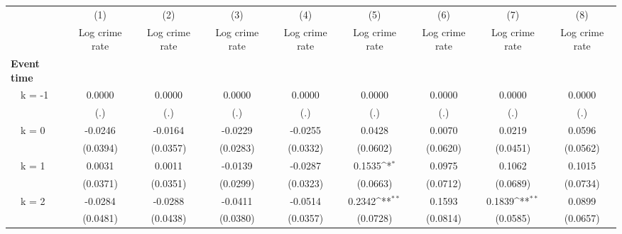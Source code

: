 {
\def\sym#1{\ifmmode^{#1}\else\(^{#1}\)\fi}
\begin{tabular}{l*{8}{c}}
\toprule
                &\multicolumn{1}{c}{(1)}&\multicolumn{1}{c}{(2)}&\multicolumn{1}{c}{(3)}&\multicolumn{1}{c}{(4)}&\multicolumn{1}{c}{(5)}&\multicolumn{1}{c}{(6)}&\multicolumn{1}{c}{(7)}&\multicolumn{1}{c}{(8)}\\
                &\multicolumn{1}{c}{Log crime rate}&\multicolumn{1}{c}{Log crime rate}&\multicolumn{1}{c}{Log crime rate}&\multicolumn{1}{c}{Log crime rate}&\multicolumn{1}{c}{Log crime rate}&\multicolumn{1}{c}{Log crime rate}&\multicolumn{1}{c}{Log crime rate}&\multicolumn{1}{c}{Log crime rate}\\
\midrule
\textbf{Event time}&                  &                  &                  &                  &                  &                  &                  &                  \\
\addlinespace
~~k = -1        &   0.0000         &   0.0000         &   0.0000         &   0.0000         &   0.0000         &   0.0000         &   0.0000         &   0.0000         \\
                &      (.)         &      (.)         &      (.)         &      (.)         &      (.)         &      (.)         &      (.)         &      (.)         \\
\addlinespace
~~k = 0         &  -0.0246         &  -0.0164         &  -0.0229         &  -0.0255         &   0.0428         &   0.0070         &   0.0219         &   0.0596         \\
                & (0.0394)         & (0.0357)         & (0.0283)         & (0.0332)         & (0.0602)         & (0.0620)         & (0.0451)         & (0.0562)         \\
\addlinespace
~~k = 1         &   0.0031         &   0.0011         &  -0.0139         &  -0.0287         &   0.1535\sym{*}  &   0.0975         &   0.1062         &   0.1015         \\
                & (0.0371)         & (0.0351)         & (0.0299)         & (0.0323)         & (0.0663)         & (0.0712)         & (0.0689)         & (0.0734)         \\
\addlinespace
~~k = 2         &  -0.0284         &  -0.0288         &  -0.0411         &  -0.0514         &   0.2342\sym{**} &   0.1593         &   0.1839\sym{**} &   0.0899         \\
                & (0.0481)         & (0.0438)         & (0.0380)         & (0.0357)         & (0.0728)         & (0.0814)         & (0.0585)         & (0.0657)         \\

\end{tabular}}
